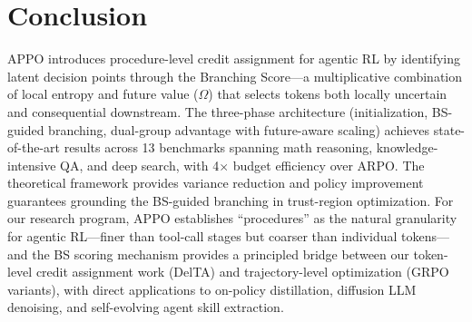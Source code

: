 \documentclass[11pt,a4paper]{article}
\begin{document}
\section{Conclusion}

APPO introduces procedure-level credit assignment for agentic RL by identifying latent decision points through the Branching Score---a multiplicative combination of local entropy and future value ($\Omega$) that selects tokens both locally uncertain and consequential downstream. The three-phase architecture (initialization, BS-guided branching, dual-group advantage with future-aware scaling) achieves state-of-the-art results across 13 benchmarks spanning math reasoning, knowledge-intensive QA, and deep search, with 4$\times$ budget efficiency over ARPO. The theoretical framework provides variance reduction and policy improvement guarantees grounding the BS-guided branching in trust-region optimization. For our research program, APPO establishes ``procedures'' as the natural granularity for agentic RL---finer than tool-call stages but coarser than individual tokens---and the BS scoring mechanism provides a principled bridge between our token-level credit assignment work (DelTA) and trajectory-level optimization (GRPO variants), with direct applications to on-policy distillation, diffusion LLM denoising, and self-evolving agent skill extraction.
\end{document}
